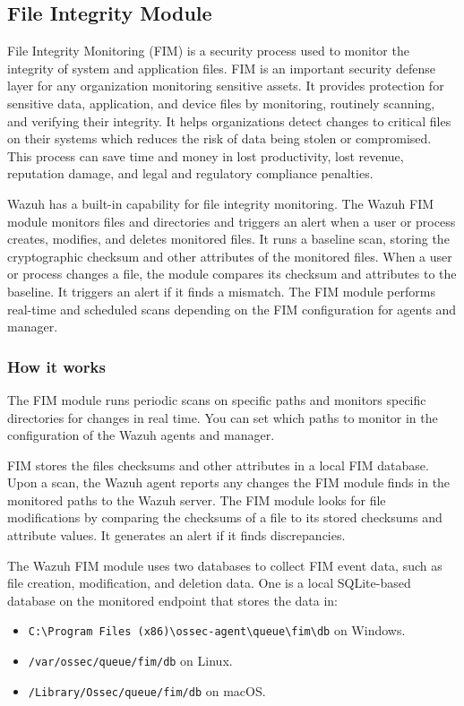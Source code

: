 \subsection{File Integrity Module}
File Integrity Monitoring (FIM) is a security process used to monitor the integrity of system and application files. FIM is an important security defense layer for any organization monitoring sensitive assets. It provides protection for sensitive data, application, and device files by monitoring, routinely scanning, and verifying their integrity. It helps organizations detect changes to critical files on their systems which reduces the risk of data being stolen or compromised. This process can save time and money in lost productivity, lost revenue, reputation damage, and legal and regulatory compliance penalties.

Wazuh has a built-in capability for file integrity monitoring. The Wazuh FIM module monitors files and directories and triggers an alert when a user or process creates, modifies, and deletes monitored files. It runs a baseline scan, storing the cryptographic checksum and other attributes of the monitored files. When a user or process changes a file, the module compares its checksum and attributes to the baseline. It triggers an alert if it finds a mismatch. The FIM module performs real-time and scheduled scans depending on the FIM configuration for agents and manager.

\subsubsection{How it works}
The FIM module runs periodic scans on specific paths and monitors specific directories for changes in real time. You can set which paths to monitor in the configuration of the Wazuh agents and manager.

FIM stores the files checksums and other attributes in a local FIM database. Upon a scan, the Wazuh agent reports any changes the FIM module finds in the monitored paths to the Wazuh server. The FIM module looks for file modifications by comparing the checksums of a file to its stored checksums and attribute values. It generates an alert if it finds discrepancies.

The Wazuh FIM module uses two databases to collect FIM event data, such as file creation, modification, and deletion data. One is a local SQLite-based database on the monitored endpoint that stores the data in:
\begin{itemize}
    \item \texttt{C:\textbackslash Program Files (x86)\textbackslash ossec-agent\textbackslash queue\textbackslash fim\textbackslash db} on Windows.
    \item \texttt{/var/ossec/queue/fim/db} on Linux.
    \item \texttt{/Library/Ossec/queue/fim/db} on macOS.
\end{itemize}

